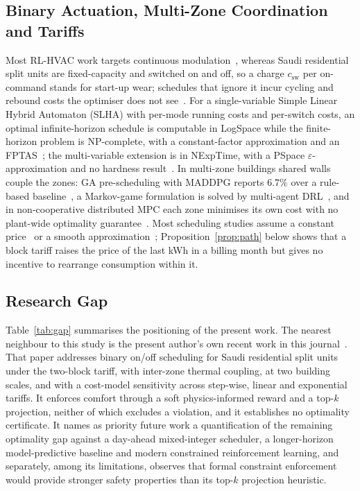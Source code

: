\documentclass[3p,twocolumn,number]{elsarticle}
\newcommand{\csw}{c_{\mathrm{sw}}}
\begin{document}
\subsection{Binary Actuation, Multi-Zone Coordination and Tariffs}

Most RL-HVAC work targets continuous modulation~\cite{Wang2024DRL}, whereas Saudi residential split units are fixed-capacity and switched on and off, so a charge $\csw$ per on-command stands for start-up wear; schedules that ignore it incur cycling and rebound costs the optimiser does not see~\cite{Faddel2023}. For a single-variable Simple Linear Hybrid Automaton (SLHA) with per-mode running costs and per-switch costs, an optimal infinite-horizon schedule is computable in LogSpace while the finite-horizon problem is NP-complete, with a constant-factor approximation and an FPTAS~\cite{Mousa2016}; the multi-variable extension is in NExpTime, with a PSpace $\varepsilon$-approximation and no hardness result~\cite{Mousa2017}. In multi-zone buildings shared walls couple the zones: GA pre-scheduling with MADDPG reports $6.7\%$ over a rule-based baseline~\cite{Xue2025}, a Markov-game formulation is solved by multi-agent DRL~\cite{Yu2021}, and in non-cooperative distributed MPC each zone minimises its own cost with no plant-wide optimality guarantee~\cite{Scattolini2009}. Most scheduling studies assume a constant price~\cite{ElMakroum2023} or a smooth approximation~\cite{Risbeck2017}; Proposition~\ref{prop:path} below shows that a block tariff raises the price of the last kWh in a billing month but gives no incentive to rearrange consumption within it.

\subsection{Research Gap}
\label{subsec:gap}
 
Table~\ref{tab:gap} summarises the positioning of the present work. The nearest neighbour to this study is the present author's own recent work in this journal~\cite{Faraj2026}. That paper addresses binary on/off scheduling for Saudi residential split units under the two-block tariff, with inter-zone thermal coupling, at two building scales, and with a cost-model sensitivity across step-wise, linear and exponential tariffs. It enforces comfort through a soft physics-informed reward and a top-$k$ projection, neither of which excludes a violation, and it establishes no optimality certificate. It names as priority future work a quantification of the remaining optimality gap against a day-ahead mixed-integer scheduler, a longer-horizon model-predictive baseline and modern constrained reinforcement learning, and separately, among its limitations, observes that formal constraint enforcement would provide stronger safety properties than its top-$k$ projection heuristic.
\end{document}
